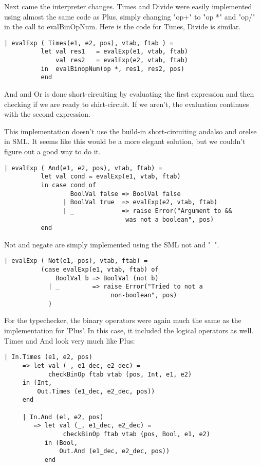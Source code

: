 \documentclass[10pt]{article}
\begin{document}
Next came the interpreter changes. Times and Divide were easily implemented using almost the same code as Plus, simply changing "op+" to "op *" and "op/" in the call to evalBinOpNum. Here is the code for Times, Divide is similar.

\begin{Verbatim}[frame=single]
    | evalExp ( Times(e1, e2, pos), vtab, ftab ) =
          let val res1   = evalExp(e1, vtab, ftab)
              val res2   = evalExp(e2, vtab, ftab)
          in  evalBinopNum(op *, res1, res2, pos)
          end
\end{Verbatim}

And and Or is done short-circuiting by evaluating the first expression and then checking if we are ready to shirt-circuit. If we aren't, the evaluation continues with the second expression.

This implementation doesn't use the build-in short-circuiting andalso and orelse in SML. It seems like this would be a more elegant solution, but we couldn't figure out a good way to do it.

\begin{Verbatim}[frame=single]
    | evalExp ( And(e1, e2, pos), vtab, ftab) =
          let val cond = evalExp(e1, vtab, ftab)
          in case cond of
                  BoolVal false => BoolVal false
                | BoolVal true  => evalExp(e2, vtab, ftab)
                | _             => raise Error("Argument to && 
                                 was not a boolean", pos)
          end
\end{Verbatim}

Not and negate are simply implemented using the SML not and "~".

\begin{Verbatim}[frame=single]
    | evalExp ( Not(e1, pos), vtab, ftab) =
          (case evalExp(e1, vtab, ftab) of
              BoolVal b => BoolVal (not b)
            | _         => raise Error("Tried to not a
            				 non-boolean", pos)
            )
\end{Verbatim}

For the typechecker, the binary operators were again much the same as the implementation for 'Plus'. In this case, it included the logical operators as well. Times and And look very much like Plus:

\begin{Verbatim}[frame=single]
   | In.Times (e1, e2, pos)
     => let val (_, e1_dec, e2_dec) = 
     		checkBinOp ftab vtab (pos, Int, e1, e2)
     in (Int,
         Out.Times (e1_dec, e2_dec, pos))
     end

     | In.And (e1, e2, pos)
        => let val (_, e1_dec, e2_dec) = 
        		checkBinOp ftab vtab (pos, Bool, e1, e2) 
           in (Bool,
               Out.And (e1_dec, e2_dec, pos))
           end
\end{Verbatim}
\end{document}
